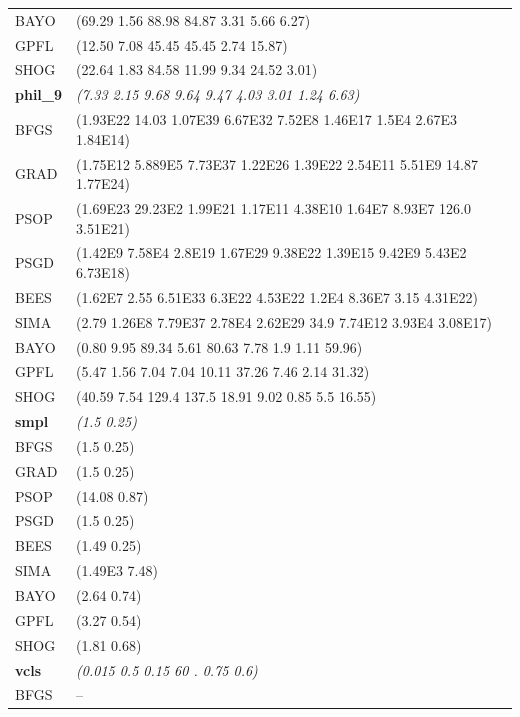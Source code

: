 \begin{table}
\begin{tabular}{ll}
		{\color{red}BAYO} & {\color{red}(69.29 1.56 88.98 84.87 3.31 5.66 6.27)}\\
		{\color{red}GPFL} & {\color{red}(12.50 7.08 45.45 45.45 2.74 15.87)}\\
		{\color{red}SHOG} & {\color{red}(22.64 1.83 84.58 11.99 9.34 24.52 3.01)}\\
		\hline
		\textbf{phil\_9} & \textit{(7.33 2.15 9.68 9.64 9.47 4.03 3.01 1.24 6.63)}\\
		\hline
		BFGS & (1.93E22 14.03 1.07E39 6.67E32 7.52E8 1.46E17 1.5E4 2.67E3 1.84E14)\\
		GRAD & (1.75E12 5.889E5 7.73E37 1.22E26 1.39E22 2.54E11 5.51E9 14.87 1.77E24)\\
		PSOP & (1.69E23 29.23E2 1.99E21 1.17E11 4.38E10 1.64E7 8.93E7 126.0 3.51E21)\\
		PSGD & (1.42E9 7.58E4 2.8E19 1.67E29 9.38E22 1.39E15 9.42E9 5.43E2 6.73E18)\\
		BEES & (1.62E7 2.55 6.51E33 6.3E22 4.53E22 1.2E4 8.36E7 3.15 4.31E22)\\
		SIMA & (2.79 1.26E8 7.79E37 2.78E4 2.62E29 34.9 7.74E12 3.93E4 3.08E17)\\
		{\color{red}BAYO} & {\color{red}(0.80 9.95 89.34 5.61 80.63 7.78 1.9 1.11 59.96)}\\
		{\color{red}GPFL} & {\color{red}(5.47 1.56 7.04 7.04 10.11 37.26 7.46 2.14 31.32)}\\
		{\color{red}SHOG} & {\color{red}(40.59 7.54 129.4 137.5 18.91 9.02 0.85 5.5 16.55)}\\
		\hline
		\textbf{smpl} & \textit{(1.5 0.25)}\\
		\hline
		{\color{red}BFGS} & {\color{red}(1.5 0.25)}\\
		{\color{red}GRAD} & {\color{red}(1.5 0.25)}\\
		{\color{red}PSOP} & {\color{red}(14.08 0.87)}\\
		{\color{red}PSGD} & {\color{red}(1.5 0.25)}\\
		{\color{red}BEES} & {\color{red}(1.49 0.25)}\\
		SIMA & (1.49E3 7.48)\\
		{\color{red}BAYO} & {\color{red}(2.64 0.74)}\\
		{\color{red}GPFL} & {\color{red}(3.27 0.54)}\\
		{\color{red}SHOG} & {\color{red}(1.81 0.68)}\\
		\hline
		\textbf{vcls} & \textit{(0.015 0.5 0.15 60 . 0.75 0.6)}\\
		\hline
		BFGS & --\\

\end{tabular}
\end{table}
